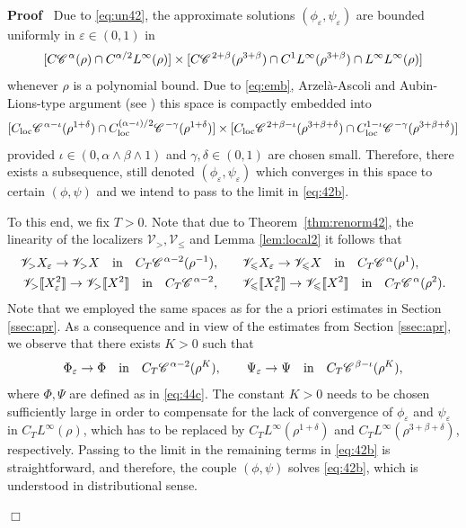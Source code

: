 \documentclass[a4paper,11pt]{article}
\renewcommand{\leq}{\leqslant}
\newenvironment{proof}{\noindent\textbf{Proof\ }}{\hspace*{\fill}$\Box$\medskip}
\numberwithin{equation}{section}
\newcommand{\CC}{\mathscr{C} \hspace{.1em}}
\newcommand{\VV}{\mathscr{V}}
\newcommand{\8}{\infty}
\begin{document}
\begin{proof}
Due to \eqref{eq:un42}, the approximate solutions $(\phi_{\varepsilon},\psi_{\varepsilon})$ are bounded uniformly in $\varepsilon
\in (0,1)$ in
$$[C\CC^{\alpha}(\rho)\cap C^{\alpha/2}L^{\infty}(\rho)] \times[C\CC^{2+\beta}(\rho^{3+\beta})\cap C^{1}L^{\infty}(\rho^{3+\beta})\cap L^{\infty}L^{\infty}(\rho)]$$
whenever $\rho$ is a polynomial bound. Due to \eqref{eq:emb}, Arzel\`a-Ascoli and Aubin-Lions-type argument (see \cite[Lemma 1, Theorem 5]{S87}) this space is compactly embedded into
$$[C_{\rm{loc}}\CC^{\alpha-\iota}(\rho^{1+\delta})\cap C^{(\alpha-\iota)/2}_{\rm{loc}}\CC^{-\gamma}(\rho^{1+\delta}) ]\times [C_{\rm{loc}}\CC^{2+\beta-\iota}(\rho^{3+\beta+\delta})\cap C^{1-\iota}_{\rm{loc}}\CC^{-\gamma}(\rho^{3+\beta+\delta}) ]$$ provided  $\iota\in (0,\alpha\wedge\beta\wedge1)$ and $\gamma,\delta\in (0,1)$ are chosen small. Therefore, there exists a subsequence, still denoted $(\phi_{\varepsilon},\psi_{\varepsilon})$ which converges in this space to certain $(\phi,\psi)$ and we intend to pass to the limit in  \eqref{eq:42b}.

To this end, we fix $T>0$. Note that due to Theorem~\ref{thm:renorm42}, the linearity of the localizers $\VV_{>},\VV_{\leq}$ and Lemma \ref{lem:local2} it follows that
\begin{align*}
\VV_{>} X_{\varepsilon}\to \VV_{>} X\quad\text{in}\quad C_{T}\CC^{\alpha-2} (\rho^{- 1}),
   &\qquad \VV_{\leqslant} X_{\varepsilon} \to \VV_{\leqslant} X\quad\text{in}\quad C_{T}\CC^{\alpha} (\rho^{1}),\\
 \VV_{>} \llbracket X_{\varepsilon}^2 \rrbracket \to  \VV_{>} \llbracket X^2 \rrbracket \quad\text{in}\quad C_{T}\CC^{\alpha-2},
 &\qquad  \VV_{\leqslant} \llbracket X_{\varepsilon}^2 \rrbracket\to  \VV_{\leqslant} \llbracket X^2 \rrbracket
  \quad\text{in}\quad C_{T}\CC^{\alpha} (\rho^{2}).
\end{align*}
Note that  we employed the same spaces as for the a priori estimates in Section \ref{ssec:apr}. As a consequence and in view of the estimates from Section \ref{ssec:apr}, we observe that there exists $K>0$ such that
$$\Phi_{\varepsilon}\to\Phi\quad\text{in}\quad C_{T}\CC^{\alpha-2}(\rho^{K}),\qquad \Psi_{\varepsilon}\to\Psi\quad\text{in}\quad C_{T}\CC^{\beta-\iota}(\rho^{K}),$$
where $\Phi,\Psi$ are defined as in \eqref{eq:44c}. The constant $K>0$ needs to be  chosen sufficiently large in order to compensate for the lack of convergence of $\phi_{\varepsilon}$ and $\psi_{\varepsilon}$ in $C_{T}L^{\infty}(\rho)$, which has to be replaced by $C_{T}L^{\infty}(\rho^{1+\delta})$ and $C_{T}L^{\infty}(\rho^{3+\beta+\delta})$, respectively. Passing to the limit in the remaining terms in \eqref{eq:42b} is straightforward, and therefore, the couple $(\phi,\psi)$ solves \eqref{eq:42b}, which is understood in distributional sense.


\end{proof}
\end{document}
